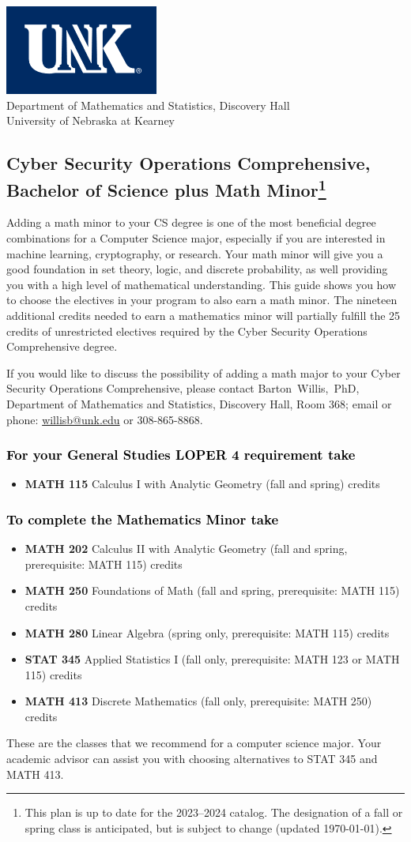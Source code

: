 \documentclass[10pt]{article}
\makeatletter
\newcommand{\calcone}{\textbf{MATH 115} Calculus I with Analytic Geometry (fall and spring) \dotfill 5 credits}
\newcommand{\calctwo}{\textbf{MATH 202} Calculus II with Analytic Geometry (fall and spring, prerequisite: MATH 115) \dotfill 5 credits }
\newcommand{\foundations}{\textbf{MATH 250} Foundations of Math (fall and spring, prerequisite: MATH 115)  \dotfill 3 credits}
\newcommand{\linear}{\textbf{MATH 280} Linear Algebra (spring only, prerequisite: MATH 115) \dotfill 3 credits}
\newcommand{\discrete}{\textbf{MATH 413} Discrete Mathematics  (fall only, prerequisite: MATH 250)\dotfill 3 credits}
\newcommand{\discreteshort}{MATH 413}
\newcommand{\appliedstat}{\textbf{STAT 345} Applied Statistics I (fall only, prerequisite: MATH 123 or MATH 115) \dotfill 3 credits}
\newcommand{\appliedstatshort}{STAT 345}
\newcommand{\contactbw}{\mbox{Barton Willis, PhD}, Department of Mathematics and Statistics,  Discovery Hall, Room 368;
email or phone: \href{mailto:willisb@unk.edu}{willisb@unk.edu} or 308-865-8868.}
\newcommand{\forinfo}[2]{If you would like to discuss the possibility of adding a math {#1} to your {#2}, please contact \contactbw}
\newcommand{\catalog}{2023--2024 }
\newcommand{\LOPER}{LOPER\xspace}
\newcommand{\myfootnote}{\footnote{This plan is up to date for  the \catalog catalog. The designation of a fall or spring class is 
anticipated, but  is subject to change (updated \today).}}
\newcommand{\myheading}{
\begin{flushleft}
\includegraphics[scale=0.35]{unk-logo}\\
\setcounter{footnote}{0}
\vspace{0.25in}
 \textcolor{unkblue}{Department of Mathematics and Statistics, Discovery Hall} \\
  \textcolor{unkblue}{University of Nebraska at Kearney}
\end{flushleft}}
\makeatother
\begin{document}
\vfill 
\newpage



\myheading

\subsection*{\textbf{\textcolor{unkblue}{Cyber Security Operations Comprehensive, Bachelor of Science plus Math Minor\myfootnote}}}

Adding a math minor to your CS degree is one of the most beneficial degree combinations 
for a Computer Science major, especially if you are interested in machine learning, 
cryptography,  or research.  Your math minor will give you a good foundation in 
set theory, logic, and discrete probability, as well providing you with a high level of 
mathematical understanding. This guide shows you how to choose the electives in your program to also 
earn a math minor. The nineteen additional credits needed to earn a mathematics minor 
will partially fulfill the 25 credits of unrestricted electives required by the 
Cyber Security Operations Comprehensive degree.

 
 \forinfo{major}{Cyber Security Operations Comprehensive}


\vspace{-0.1in}

\subsubsection*{\textcolor{black}{For  your General Studies \LOPER 4 requirement take}}
\begin{itemize}
\item  \calcone
\end{itemize}

\subsubsection*{\textcolor{black}{To complete the Mathematics Minor take}}

\begin{itemize}
\item \calctwo
\item \foundations
\item \linear
\item \appliedstat
\item \discrete
\end{itemize}
These are the classes that we recommend for a computer science major.
Your academic advisor can assist you with choosing alternatives 
to \appliedstatshort{} and \discreteshort{}.
\end{document}

